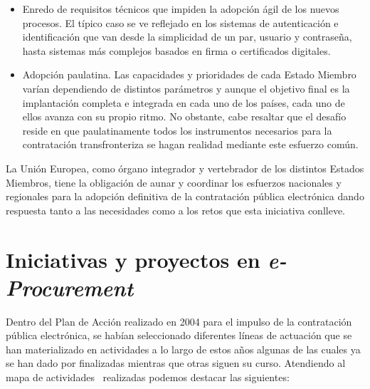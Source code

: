 \begin{itemize}
\item Enredo de requisitos técnicos que impiden la adopción ágil de los nuevos procesos. El típico
caso se ve reflejado en los sistemas de autenticación e identificación que van desde la simplicidad de un 
par, usuario y contraseña, hasta sistemas más complejos basados en firma o certificados
digitales. 

\item Adopción paulatina. Las capacidades y prioridades de cada Estado Miembro varían dependiendo
de distintos parámetros y aunque el objetivo final es la implantación completa e integrada en cada
uno de los países, cada uno de ellos avanza con su propio ritmo. No obstante, cabe resaltar
que el desafío reside en que paulatinamente todos los instrumentos necesarios para la contratación
transfronteriza se hagan realidad mediante este esfuerzo común.
\end{itemize}

La Unión Europea, como órgano integrador y vertebrador de los distintos Estados Miembros, tiene la obligación
de aunar y coordinar los esfuerzos nacionales y regionales para la adopción definitiva de la contratación
pública electrónica dando respuesta tanto a las necesidades como a los retos que esta iniciativa conlleve.

\section{Iniciativas y proyectos en \textit{e-Procurement}}
Dentro del Plan de Acción realizado en 2004 para el impulso de la contratación pública electrónica, se habían
seleccionado diferentes líneas de actuación que se han materializado en actividades a lo largo de estos años algunas de las cuales ya se han 
dado por finalizadas mientras que otras siguen su curso. Atendiendo 
al mapa de actividades~\cite{e-Proc-map-paper} realizadas podemos destacar las siguientes:

